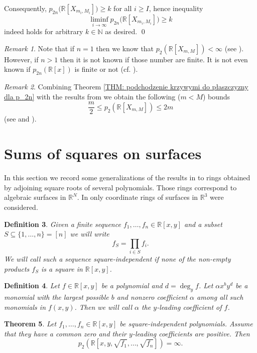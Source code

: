 \documentclass[12pt,reqno]{amsart}   	%
\newtheorem{thm}{Theorem}[section]
\newtheorem{df}[thm]{Definition}
\theoremstyle{remark}
\newtheorem{remark}[thm]{Remark}
\newcommand{\R}{\mathbb{R}}
\newcommand{\N}{\mathbb{N}}
\newcommand{\brac}[1]{\left ( #1 \right )}
\begin{document}
Consequently,  $p_{2n}\big(\R[X_{m_i,M_i}]\big) \geq k$ for all $i \geq I$, hence inequality
$$
    \liminf_{i \rightarrow \infty} p_{2n}
        \big(
        \R [X_{m_i,M_i}]
        \big)
    \geq k
$$
indeed holds for arbitrary $k \in \N$ as desired.
\hfill \qed


\begin{remark}
    Note that if $n=1$ then we know that $p_2(\R[X_{m,M}]) < \infty$ (see \cite[Theorem 2.7]{cldr1982}). However, if $n>1$ then it is not known if those number are finite. It is not even known if $p_{2n}(\R[x])$ is finite or not (cf. \cite[Question 5.1]{kv2023}).
\end{remark}


\begin{remark}
Combining Theorem \ref{THM: podchodzenie krzywymi do płaszczyzny dla p_2n} with the results from \cite{scheiderer2017} we obtain the following ($m<M$) bounds 
$$ \frac{m}{2} \leq p_2(\R[X_{m,M}]) \leq 2m $$
(see \cite[Theorem 3.6]{scheiderer2017} and  \cite[Theorem 3.1]{cldr1982}).

\end{remark}


\section{Sums of squares on surfaces}
In this section we record some generalizations of the results in \cite{bk2024} to rings obtained by adjoining square roots of several polynomials. Those rings correspond to algebraic surfaces in $\R^N$. In \cite{bk2024} only coordinate rings of surfaces in $\R^3$ were considered.

\begin{df}
    Given a finite sequence $f_1,\dots, f_n\in\R[x,y]$ and a subset $S\subseteq\{1,\dots, n\}=[n]$ we will write
    \[
    f_S = \prod_{i\in S} f_i.
    \]
    We will call such a sequence square-independent if none of the non-empty products $f_S$ is a square in $\R[x,y]$.
\end{df}

\begin{df}
    Let $f\in\R[x,y]$ be a polynomial and $d = \deg_y f$. Let $\alpha x^b y^d$ be a monomial with the largest possible $b$ and nonzero coefficient $\alpha$ among all such monomials in $f(x,y)$. Then we will call $\alpha$ the $y$-leading coefficient of $f$.
\end{df}

\begin{thm}\label{positive-leading}
    Let $f_1,\dots, f_n\in \R[x,y]$ be square-independent polynomials. Assume that they have a common zero and their $y$-leading coefficients are positive. Then
    \[
    p_2\brac{\R[x,y,\sqrt{f_1},\dots, \sqrt{f_n}]} = \infty.
    \]
\end{thm}
\end{document}
